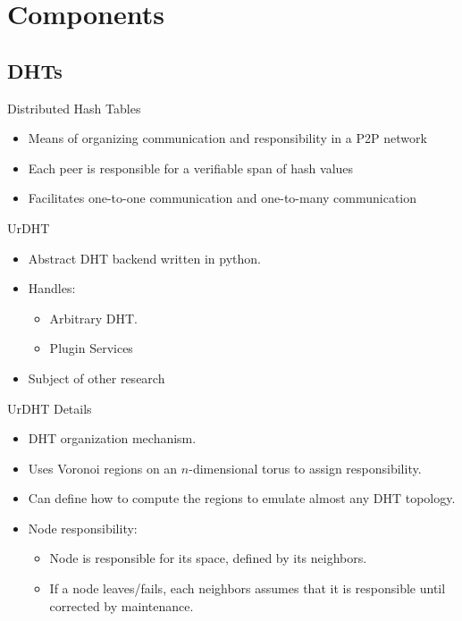 \documentclass[11pt]{beamer}
\begin{document}

\section{Components}

\subsection{DHTs}
\begin{frame}{Distributed Hash Tables}

	\begin{itemize}
		\item  Means of organizing communication and responsibility in a P2P network
		\item  Each peer is responsible for a verifiable span of hash values
		\item  Facilitates one-to-one communication and one-to-many communication
	\end{itemize}

\end{frame}

\begin{frame}{UrDHT}
	\begin{itemize}
		\item Abstract DHT backend written in python.
		\item Handles:
		\begin{itemize}
			\item Arbitrary DHT.
			\item Plugin Services
		\end{itemize}
		\item Subject of other research
	\end{itemize}
\end{frame}

\begin{frame}{UrDHT Details}
	\begin{itemize}
		\item DHT organization mechanism.
		\item Uses Voronoi regions on an $n$-dimensional torus to assign responsibility.
		\item Can define how to compute the regions to emulate almost any DHT topology.
		\item Node responsibility:
		\begin{itemize}
			\item Node is  responsible for its space, defined by its neighbors.
			\item If a node leaves/fails, each neighbors assumes that it is responsible until corrected by maintenance. 
		\end{itemize}
	\end{itemize}


\end{frame}
\end{document}
